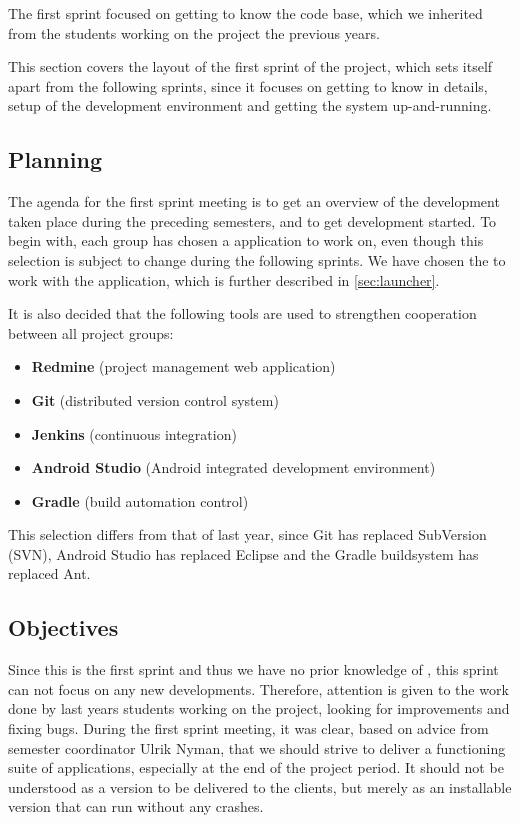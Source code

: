 The first sprint focused on getting to know the \giraf code base, which we inherited from the students working on the project the previous years. 

This section covers the layout of the first sprint of the project, which sets itself apart from the following sprints, since it focuses on getting to know \giraf in details, setup of the development environment and getting the system up-and-running.

\subsection{Planning}\label{sec:sprint1:planning}
The agenda for the first sprint meeting is to get an overview of the development taken place during the preceding semesters, and to get development started.
To begin with, each group has chosen a \giraf application to work on, even though this selection is subject to change during the following sprints.
We have chosen the to work with the \launcher application, which is further described in \cref{sec:launcher}.

It is also decided that the following tools are used to strengthen cooperation between all project groups:

\begin{itemize}
\item \textbf{Redmine} (project management web application)
\item \textbf{Git} (distributed version control system)
\item \textbf{Jenkins} (continuous integration)
\item \textbf{Android Studio} (Android integrated development environment)
\item \textbf{Gradle} (build automation control)
\end{itemize}

This selection differs from that of last year, since Git has replaced SubVersion (SVN), Android Studio has replaced Eclipse and the Gradle buildsystem has replaced Ant.

\subsection{Objectives}\label{sec:sprint1:objectives}
Since this is the first sprint and thus we have no prior knowledge of \giraf, this sprint can not focus on any new developments.
Therefore, attention is given to the work done by last years students working on the project, looking for improvements and fixing bugs.
During the first sprint meeting, it was clear, based on advice from semester coordinator Ulrik Nyman, that we should strive to deliver a functioning suite of applications, especially at the end of the project period.
It should not be understood as a version to be delivered to the clients, but merely as an installable version that can run without any crashes. 

